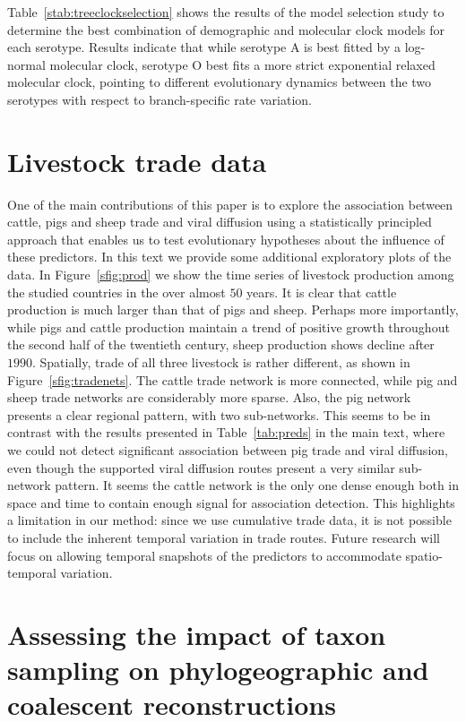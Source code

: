 \documentclass[a4paper,10pt]{article}
\begin{document}
Table~\ref{stab:treeclockselection} shows the results of the model selection study to determine the best combination of demographic and molecular clock models for each serotype.
Results indicate that while serotype A is best fitted by a log-normal molecular clock, serotype O best fits a more strict exponential relaxed molecular clock, pointing to different evolutionary dynamics between the two serotypes with respect to branch-specific rate variation. 

\section{Livestock trade data}

One of the main contributions of this paper is to explore the association between cattle, pigs and sheep trade and viral diffusion using a statistically principled approach that enables us to test evolutionary hypotheses about the influence of these predictors.
In this text we provide some additional exploratory plots of the data.
In Figure~\ref{sfig:prod} we show the time series of livestock production among the studied countries in the over almost $50$ years.
It is clear that cattle production is much larger than that of pigs and sheep.
Perhaps more importantly, while pigs and cattle production maintain a trend of positive growth throughout the second half of the twentieth century, sheep production shows decline after $1990$.
Spatially, trade of all three livestock is rather different, as shown in Figure~\ref{sfig:tradenets}.
The cattle trade network is more connected, while pig and sheep trade networks are considerably more sparse.
Also, the pig network presents a clear regional pattern, with two sub-networks.
This seems to be in contrast with the results presented in Table~\ref{tab:preds} in the main text, where we could not detect significant association between pig trade and viral diffusion, even though the supported viral diffusion routes present a very similar sub-network pattern.
It seems the cattle network is the only one dense enough both in space and time to contain enough signal for association detection.
This highlights a limitation in our method: since we use cumulative trade data, it is not possible to include the inherent temporal variation in trade routes.
Future research will focus on allowing temporal snapshots of the predictors to accommodate spatio-temporal variation.

\section{Assessing the impact of taxon sampling on phylogeographic and coalescent reconstructions}
\end{document}

